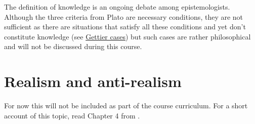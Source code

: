 \documentclass[
]{book}
\begin{document}
The definition of knowledge is an ongoing debate among epistemologists. Although the three criteria from Plato are necessary conditions, they are not sufficient as there are situations that satisfy all these conditions and yet don't constitute knowledge (see \href{https://en.wikipedia.org/wiki/Gettier_case}{Gettier cases}) but such cases are rather philosophical and will not be discussed during this course.

\hypertarget{realism}{%
\section{Realism and anti-realism}\label{realism}}

For now this will not be included as part of the course curriculum. For a short account of this topic, read Chapter 4 from \citep{okasha-pos}.

  
\end{document}
